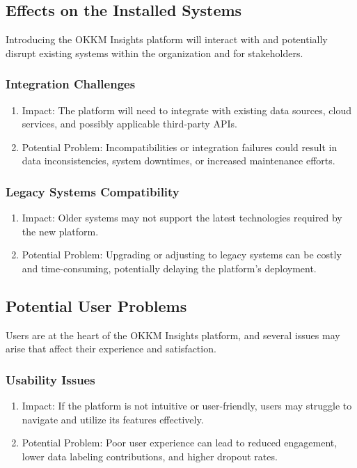 \documentclass[12pt]{article}
\begin{document}
\subsection{Effects on the Installed Systems}
Introducing the OKKM Insights platform will interact with and potentially disrupt existing systems within the organization and for stakeholders.
\subsubsection{Integration Challenges}
\begin{enumerate}
    \item Impact: The platform will need to integrate with existing data sources, cloud services, and possibly applicable third-party APIs.
    \item Potential Problem: Incompatibilities or integration failures could result in data inconsistencies, system downtimes, or increased maintenance efforts.
\end{enumerate}
\subsubsection{Legacy Systems Compatibility}
\begin{enumerate}
    \item Impact: Older systems may not support the latest technologies required by the new platform.
    \item Potential Problem: Upgrading or adjusting to legacy systems can be costly and time-consuming, potentially delaying the platform's deployment.
\end{enumerate}
\subsection{Potential User Problems}
Users are at the heart of the OKKM Insights platform, and several issues may arise that affect their experience and satisfaction.
\subsubsection{Usability Issues}
\begin{enumerate}
    \item Impact: If the platform is not intuitive or user-friendly, users may struggle to navigate and utilize its features effectively.
    \item Potential Problem: Poor user experience can lead to reduced engagement, lower data labeling contributions, and higher dropout rates.
\end{enumerate}
\end{document}
